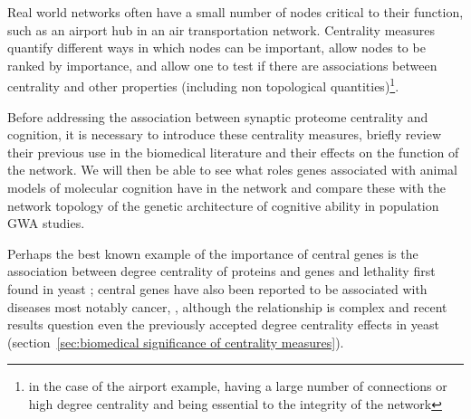 Real world networks often have a small number of nodes critical to their function, such as an airport hub in an air transportation network\cite{borenstein1989hubs}. Centrality measures quantify different ways in which nodes can be important, allow nodes to be ranked by importance, and allow one to test if there are associations between centrality and other properties (including non topological quantities)\footnote{in the case of the airport example, having a large number of connections or high degree centrality and being essential to the integrity of the network}.

Before addressing the association between synaptic proteome centrality and cognition, it is necessary to introduce these centrality measures, briefly review their previous use in the biomedical literature and their effects on the function of the network. We will then be able to see what roles genes associated with animal models of molecular cognition have in the network and compare these with the network topology of the genetic architecture of cognitive ability in population GWA studies.   

 Perhaps the best known example of the importance of central genes is the association between degree centrality of proteins and genes and lethality first found in yeast \cite{jeong2001lethality}; central genes have also been reported to be associated with diseases most notably cancer\cite{vogelstein2000surfing}, \cite{albert2005scale}, \cite{xu2006discovering} although the relationship is complex and recent results question even the previously accepted degree centrality effects in yeast (section~\ref{sec:biomedical significance of centrality measures}).
 
